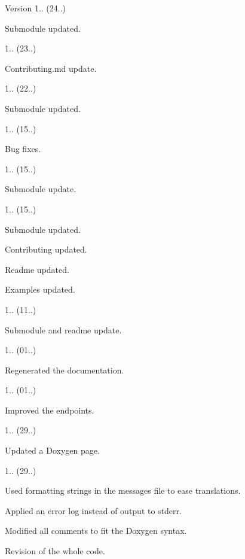 \begin{DoxyVersion}{Version}
1.. (24..)
\begin{DoxyItemize}
\item Submodule updated. 
\end{DoxyItemize}

1.. (23..)
\begin{DoxyItemize}
\item Contributing.\+md update. 
\end{DoxyItemize}

1.. (22..)
\begin{DoxyItemize}
\item Submodule updated. 
\end{DoxyItemize}

1.. (15..)
\begin{DoxyItemize}
\item Bug fixes. 
\end{DoxyItemize}

1.. (15..)
\begin{DoxyItemize}
\item Submodule update. 
\end{DoxyItemize}

1.. (15..)
\begin{DoxyItemize}
\item Submodule updated.
\item Contributing updated.
\item Readme updated.
\item Examples updated. 
\end{DoxyItemize}

1.. (11..)
\begin{DoxyItemize}
\item Submodule and readme update. 
\end{DoxyItemize}

1.. (01..)
\begin{DoxyItemize}
\item Regenerated the documentation. 
\end{DoxyItemize}

1.. (01..)
\begin{DoxyItemize}
\item Improved the endpoints. 
\end{DoxyItemize}

1.. (29..)
\begin{DoxyItemize}
\item Updated a Doxygen page. 
\end{DoxyItemize}

1.. (29..)
\begin{DoxyItemize}
\item Used formatting strings in the messages file to ease translations.
\item Applied an error log instead of output to stderr.
\item Modified all comments to fit the Doxygen syntax.
\item Revision of the whole code. 
\end{DoxyItemize}
\end{DoxyVersion}
